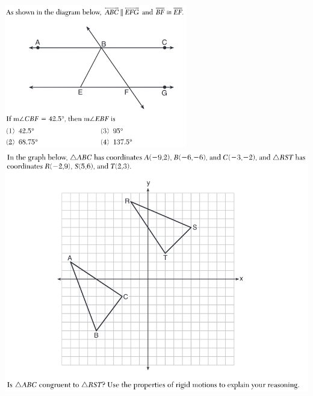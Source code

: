 \documentclass[12pt, twoside]{article}
\begin{document}
\begin{enumerate}
 \includegraphics[width=0.6\textwidth]{4-9_transversal+isosceles.png}
 \\
 \includegraphics[width=1.0\textwidth]{4-9_reflection.png}


\end{enumerate}
\end{document}
